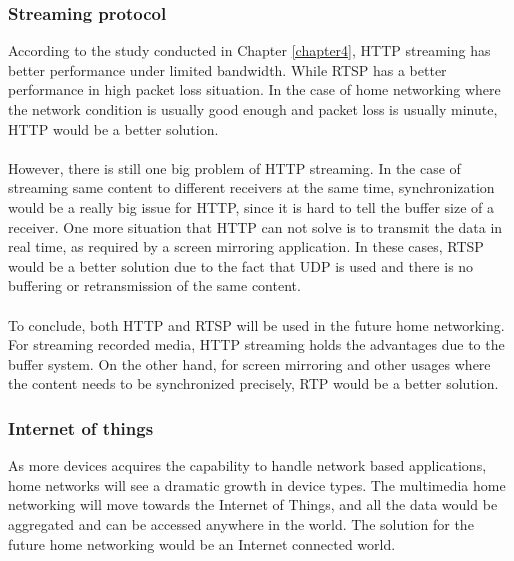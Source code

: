 \subsubsection{Streaming protocol}
According to the study conducted in Chapter \ref{chapter4}, HTTP streaming has better performance under limited bandwidth. While RTSP has a better performance in high packet loss situation. In the case of home networking where the network condition is usually good enough and packet loss is usually minute, HTTP would be a better solution. \\
\\
However, there is still one big problem of HTTP streaming. In the case of streaming same content to different receivers at the same time, synchronization would be a really big issue for HTTP, since it is hard to tell the buffer size of a receiver. One more situation that HTTP can not solve is to transmit the data in real time,  as required by a screen mirroring application. In these cases, RTSP would be a better solution due to the fact that UDP is used and there is no buffering or retransmission of the same content.\\
\\
To conclude, both HTTP and RTSP will be used in the future home networking. For streaming recorded media, HTTP streaming holds the advantages due to the buffer system. On the other hand, for screen mirroring and other usages where the content needs to be synchronized precisely, RTP would be a better solution.
\subsubsection{Internet of things}
As more devices acquires the capability to handle network based applications, home networks will see a dramatic growth in device types. The multimedia home networking will move towards the Internet of Things, and all the data would be aggregated and can be accessed anywhere in the world. The solution for the future home networking would be an Internet connected world.
